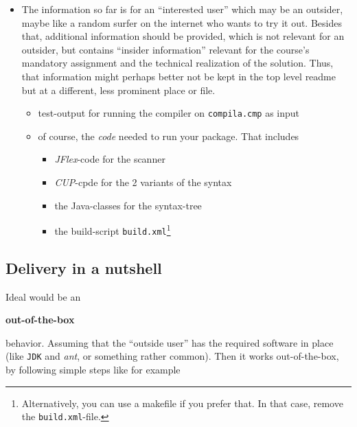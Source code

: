 \documentclass[10pt,freeform]{handout}[2014/08/13]
\begin{document}
\begin{itemize}
\item The information so far is for an ``interested user'' which may be an
  outsider, maybe like a random surfer on the internet who wants to try it
  out. Besides that, additional information should be provided, which is
  not relevant for an outsider, but contains ``insider information''
  relevant for the course's mandatory assignment and the technical
  realization of the solution. Thus, that information might perhaps better
  not be kept in the top level readme but at a different, less prominent
  place or file.
  \begin{itemize}
  \item test-output for running the compiler on \texttt{compila.cmp} as
    input
  \item of course, the \emph{code} needed to run your package. That
    includes
    \begin{itemize}
    \item \textsl{JFlex}-code for the scanner
    \item \textsl{CUP}-cpde for the 2 variants of the syntax
    \item the Java-classes for the syntax-tree
    \item the build-script \texttt{build.xml}\footnote{Alternatively, you
        can use a makefile if you prefer that. In that case, remove the
        \texttt{build.xml}-file.}
    \end{itemize}
  \end{itemize}
\end{itemize}



\subsection{Delivery in a nutshell}
\label{sec:delivery-nutshell}


Ideal would be an 
\begin{center}
  \textbf{out-of-the-box}
\end{center}
behavior. Assuming that the ``outside user'' has the required software in
place (like \texttt{JDK} and \emph{ant}, or something rather common). Then
it works out-of-the-box, by following simple steps like for example
\end{document}
